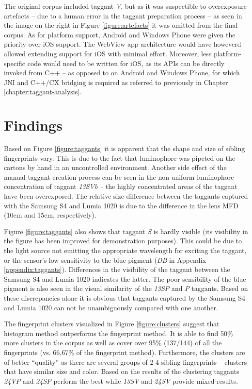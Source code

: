 \documentclass[thesis.tex]{subfiles}
\begin{document}
The original corpus included taggant \emph{V}, but as it was suspectible to overexposure artefacts -- due to a human error in the taggant preparation process -- as seen in the image on the right in Figure \ref{figure:artefacts} it was omitted from the final corpus. As for platform support, Android and Windows Phone were given the priority over iOS support. The WebView app architecture would have howeverd allowed extending support for iOS with minimal effort. Moreover, less platform-specific code would need to be written for iOS, as its APIs can be directly invoked from C++ -- as opposed to on Android and Windows Phone, for which JNI and C++/CX bridging is required as referred to previously in Chapter \ref{chapter:taggant-analysis}.

\section{Findings}
\label{chapter:findings}

Based on Figure \ref{figure:taggants} it is apparent that the shape and size of sibling fingerprints vary. This is due to the fact that luminophore was pipeted on the cartons by hand in an uncontrolled environment. Another side effect of the manual taggant creation process can be seen in the non-uniform luminophore concentration of taggant \emph{13SVb} -- the highly concentrated areas of the taggant have been overexposed. The relative size difference between the taggants captured with the Samsung S4 and Lumia 1020 is due to the difference in the lens MFD (10cm and 15cm, respectively).

Figure \ref{figure:taggants} also shows that taggant \emph{S} is hardly visible (its visibility in the figure has been improved for demonstration purposes). This could be due to the light source not emitting the appropriate wavelength for exciting the taggant, or the sensor's low sensitivity to the blue pigment (\emph{DB} in Appendix \ref{appendix:taggants}). Differences in the visibility of the taggant between the Samsung S4 and Lumia 1020 indicates the latter. The poor sensibility of the blue pigment is also seen in the visual similarity of the \emph{13SP} and \emph{P} taggants. Based on these discrepancies alone it is obvious that taggants captured by the Samsung S4 and Lumia 1020 can not be unambiguously compared with one another.

The fingerprint clusters visualized in Figure \ref{figure:clusters} suggest that histogram method outperforms the fingerprint method. It is able to find 50\% more clusters in the corpus as well as cover over 95\% (137/144) of all the fingerprints (vs. 66,67\% of the fingerprint method). Furthermore, the clusters are of better ``quality'' as there are several groups of 2-4 sibling fingerprints -- clusters that have similar size and color. Based on the results of the clustering taggants \emph{24VP} and \emph{24SP} perform the best while \emph{13SV} and \emph{24SV} provide mixed results.
\end{document}
